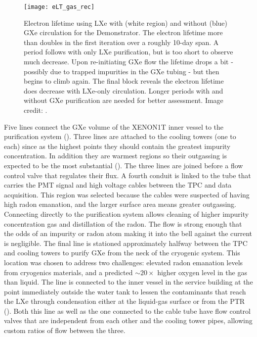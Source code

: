 \begin{figure}
\centering
\texttt{[image: eLT\_gas\_rec]}
\caption{Electron lifetime using LXe with (white region) and without (blue) GXe circulation for the Demonstrator.  The electron lifetime
more than doubles in the first iteration over a roughly 10-day span.  A period follows with
only LXe purification, but is too short to observe much decrease.  Upon re-initiating GXe flow the lifetime drops a bit - possibly due to
trapped impurities in the GXe tubing - but then begins to climb again.  The final block reveals the electron lifetime does
decrease with LXe-only circulation.  Longer periods with and without GXe purification are needed for better assessment.  Image credit:
.}
\label{fig:electron_lifetime_model_gxe_demonstrator}
\end{figure}

Five lines connect the GXe volume of the XENON1T inner vessel to the purification system ().  Three lines are
attached to the cooling towers (one to each) since as the highest points they should contain the greatest impurity concentration.  In
addition they are warmest regions so their outgassing is expected to be the most
substantial ().  The three lines are joined before a flow control valve
that regulates their flux.  A fourth conduit is linked to the tube that carries the PMT signal and high voltage cables between the TPC and
data acquisition.  This region was selected because the cables were suspected of having high radon emanation, and the larger surface area
means greater outgassing.  Connecting directly to the purification system allows cleaning of higher impurity concentration gas and
distillation of the radon.  The flow is strong enough that the odds of an impurity or radon atom making it into the bell against the
current is negligible.  The final line is stationed
approximately halfway between the TPC and cooling towers to purify GXe from the neck of the cryogenic system.  This location was
chosen to address two challenges: elevated radon emanation levels from cryogenics materials, and a predicted ${\sim}20\times$ higher
oxygen level in the gas than liquid.  The line is connected to the inner vessel in the service building at the point immediately outside
the water tank to lessen the contaminants that reach the LXe through condensation either at the liquid-gas surface or from the PTR
().  Both this line as well
as the one connected to the cable tube have flow control valves that are independent from each other and the cooling tower pipes, allowing
custom ratios of flow between the three.

